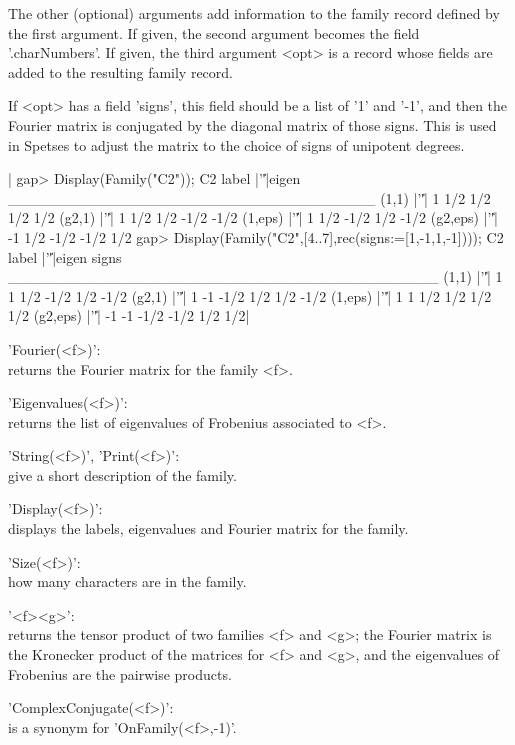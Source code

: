 The other (optional) arguments add information to the family record defined
by  the first  argument. If  given, the  second argument  becomes the field
'.charNumbers'. If given, the third argument <opt> is a record whose fields
are added to the resulting family record.

If  <opt> has a field 'signs', this field should be a list of '1' and '-1',
and  then the Fourier matrix is conjugated  by the diagonal matrix of those
signs.  This is used in Spetses to adjust the matrix to the choice of signs
of unipotent degrees.

|    gap> Display(Family("C2"));
    C2
       label |'\|'|eigen
    ___________________________________
    (1,1)    |'\|'|    1 1/2  1/2  1/2  1/2
    (g2,1)   |'\|'|    1 1/2  1/2 -1/2 -1/2
    (1,eps)  |'\|'|    1 1/2 -1/2  1/2 -1/2
    (g2,eps) |'\|'|   -1 1/2 -1/2 -1/2  1/2
    gap> Display(Family("C2",[4..7],rec(signs:=[1,-1,1,-1])));
    C2
       label |'\|'|eigen signs
    _________________________________________
    (1,1)    |'\|'|    1     1  1/2 -1/2 1/2 -1/2
    (g2,1)   |'\|'|    1    -1 -1/2  1/2 1/2 -1/2
    (1,eps)  |'\|'|    1     1  1/2  1/2 1/2  1/2
    (g2,eps) |'\|'|   -1    -1 -1/2 -1/2 1/2  1/2|


'Fourier(<f>)':\\ returns the Fourier matrix for the family <f>.

'Eigenvalues(<f>)':\\  returns the list of eigenvalues of Frobenius associated
to <f>.

'String(<f>)', 'Print(<f>)':\\ give a short description of the family.

'Display(<f>)':\\ displays the labels, eigenvalues and Fourier matrix for the
family.

'Size(<f>)':\\ how many characters are in the family.

'<f>\*<g>':\\  returns the  tensor product  of two  families <f> and <g>; the
Fourier  matrix is the Kronecker  product of the matrices  for <f> and <g>,
and the eigenvalues of Frobenius are the pairwise products.

'ComplexConjugate(<f>)':\\   is    a    synonym    for 'OnFamily(<f>,-1)'.

